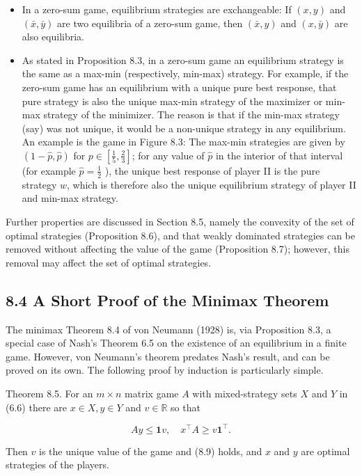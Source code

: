 \documentclass[12pt]{article}
\begin{document}
\begin{itemize}
  \item In a zero-sum game, equilibrium strategies are exchangeable: If $(x, y)$ and $(\bar{x}, \bar{y})$ are two equilibria of a zero-sum game, then $(\bar{x}, y)$ and $(x, \bar{y})$ are also equilibria.
  \item As stated in Proposition 8.3, in a zero-sum game an equilibrium strategy is the same as a max-min (respectively, min-max) strategy. For example, if the zero-sum game has an equilibrium with a unique pure best response, that pure strategy is also the unique max-min strategy of the maximizer or min-max strategy of the minimizer. The reason is that if the min-max strategy (say) was not unique, it would be a non-unique strategy in any equilibrium. An example is the game in Figure 8.3: The max-min strategies are given by $(1-\hat{p}, \hat{p})$ for $p \in\left[\frac{1}{5}, \frac{2}{3}\right]$; for any value of $\hat{p}$ in the interior of that interval (for example $\hat{p}=\frac{1}{2}$ ), the unique best response of player II is the pure strategy $w$, which is therefore also the unique equilibrium strategy of player II and min-max strategy.
\end{itemize}

Further properties are discussed in Section 8.5, namely the convexity of the set of optimal strategies (Proposition 8.6), and that weakly dominated strategies can be removed without affecting the value of the game (Proposition 8.7); however, this removal may affect the set of optimal strategies.

\subsection*{8.4 A Short Proof of the Minimax Theorem}
The minimax Theorem 8.4 of von Neumann (1928) is, via Proposition 8.3, a special case of Nash's Theorem 6.5 on the existence of an equilibrium in a finite game. However, von Neumann's theorem predates Nash's result, and can be proved on its own. The following proof by induction is particularly simple.

Theorem 8.5. For an $m \times n$ matrix game $A$ with mixed-strategy sets $X$ and $Y$ in (6.6) there are $x \in X, y \in Y$ and $v \in \mathbb{R}$ so that

$$
A y \leq \mathbf{1} v, \quad x^{\top} A \geq v \mathbf{1}^{\top} .
$$

Then $v$ is the unique value of the game and (8.9) holds, and $x$ and $y$ are optimal strategies of the players.
\end{document}

